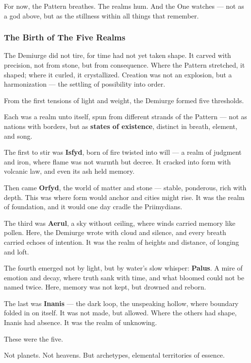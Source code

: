 \documentclass[12pt]{article}
\begin{document}
For now, the Pattern breathes.  
The realms hum.  
And the One watches — not as a god above, but as the stillness within all things that remember.

\dotfill

\subsubsection*{The Birth of The Five Realms}

The Demiurge did not tire, for time had not yet taken shape.  
It carved with precision, not from stone, but from consequence.  
Where the Pattern stretched, it shaped; where it curled, it crystallized.  
Creation was not an explosion, but a harmonization — the settling of possibility into order.

From the first tensions of light and weight, the Demiurge formed five thresholds.

Each was a realm unto itself, spun from different strands of the Pattern —  
not as nations with borders, but as \textbf{states of existence}, distinct in breath, element, and song.

The first to stir was \textbf{Isfyd}, born of fire twisted into will — a realm of judgment and iron, where flame was not warmth but decree.  
It cracked into form with volcanic law, and even its ash held memory.

Then came \textbf{Orfyd}, the world of matter and stone — stable, ponderous, rich with depth.  
This was where form would anchor and cities might rise.  
It was the realm of foundation, and it would one day cradle the Priimydians.

The third was \textbf{Aerul}, a sky without ceiling, where winds carried memory like pollen.  
Here, the Demiurge wrote with cloud and silence, and every breath carried echoes of intention.  
It was the realm of heights and distance, of longing and loft.

The fourth emerged not by light, but by water’s slow whisper: \textbf{Palus}.  
A mire of emotion and decay, where truth sank with time, and what bloomed could not be named twice.  
Here, memory was not kept, but drowned and reborn.

The last was \textbf{Inanis} — the dark loop, the unspeaking hollow, where boundary folded in on itself.  
It was not made, but allowed.  
Where the others had shape, Inanis had absence.  
It was the realm of unknowing.

These were the five.

Not planets. Not heavens.  
But archetypes, elemental territories of essence.
\end{document}

